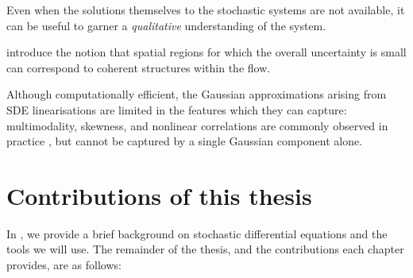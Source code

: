 Even when the solutions themselves to the stochastic systems are not available, it can be useful to garner a \emph{qualitative} understanding of the system.

\citet{Balasuriya_2020_StochasticSensitivityComputable} introduce the notion that spatial regions for which the overall uncertainty is small can correspond to coherent structures within the flow.


Although computationally efficient, the Gaussian approximations arising from SDE linearisations are limited in the features which they can capture: multimodality, skewness, and nonlinear correlations are commonly observed in practice \citep{SuraEtAl_2005_MultiplicativeNoiseNonGaussianity,BraccoEtAl_2000_VelocityProbabilityDensity,del-Castillo-Negrete_1998_AsymmetricTransportNonGaussian}, but cannot be captured by a single Gaussian component alone.


\section{Contributions of this thesis}
In , we provide a brief background on stochastic differential equations and the tools we will use.
The remainder of the thesis, and the contributions each chapter provides, are as follows:

